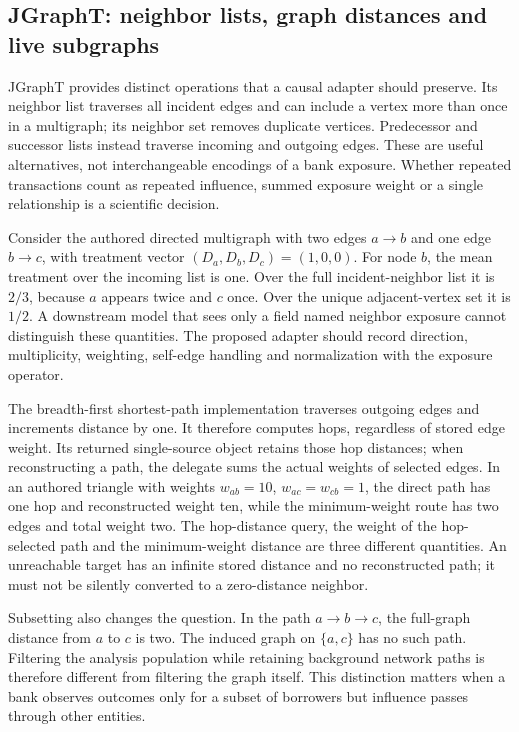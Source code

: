 \subsection{JGraphT: neighbor lists, graph distances and live subgraphs}

JGraphT provides distinct operations that a causal adapter should preserve. Its neighbor list traverses all incident edges and can include a vertex more than once in a multigraph; its neighbor set removes duplicate vertices. Predecessor and successor lists instead traverse incoming and outgoing edges. These are useful alternatives, not interchangeable encodings of a bank exposure. Whether repeated transactions count as repeated influence, summed exposure weight or a single relationship is a scientific decision.~\citep{exec25_jnet_jgrapht}

Consider the authored directed multigraph with two edges $a\to b$ and one edge $b\to c$, with treatment vector $(D_a,D_b,D_c)=(1,0,0)$. For node $b$, the mean treatment over the incoming list is one. Over the full incident-neighbor list it is $2/3$, because $a$ appears twice and $c$ once. Over the unique adjacent-vertex set it is $1/2$. A downstream model that sees only a field named neighbor exposure cannot distinguish these quantities. The proposed adapter should record direction, multiplicity, weighting, self-edge handling and normalization with the exposure operator.~\citep{exec25_jnet_choice}

The breadth-first shortest-path implementation traverses outgoing edges and increments distance by one. It therefore computes hops, regardless of stored edge weight. Its returned single-source object retains those hop distances; when reconstructing a path, the delegate sums the actual weights of selected edges. In an authored triangle with weights $w_{ab}=10$, $w_{ac}=w_{cb}=1$, the direct path has one hop and reconstructed weight ten, while the minimum-weight route has two edges and total weight two. The hop-distance query, the weight of the hop-selected path and the minimum-weight distance are three different quantities. An unreachable target has an infinite stored distance and no reconstructed path; it must not be silently converted to a zero-distance neighbor.~\citep{exec25_jnet_jgrapht,exec25_jnet_choice}

Subsetting also changes the question. In the path $a\to b\to c$, the full-graph distance from $a$ to $c$ is two. The induced graph on $\{a,c\}$ has no such path. Filtering the analysis population while retaining background network paths is therefore different from filtering the graph itself. This distinction matters when a bank observes outcomes only for a subset of borrowers but influence passes through other entities.~\citep{exec25_jnet_choice}

